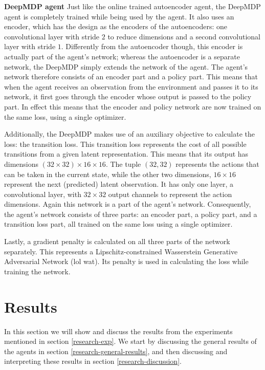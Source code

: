 \noindent \textbf{DeepMDP agent}\newline
\noindent Just like the online trained autoencoder agent, the DeepMDP agent is completely trained while being used by the agent. It also uses an encoder, which has the design as the encoders of the autoencoders: one convolutional layer with stride $2$ to reduce dimensions and a second convolutional layer with stride $1$. Differently from the autoencoder though, this encoder is actually part of the agent's network; whereas the autoencoder is a separate network, the DeepMDP simply extends the network of the agent. The agent's network therefore consists of an encoder part and a policy part. This means that when the agent receives an observation from the environment and passes it to its network, it first goes through the encoder whose output is passed to the policy part. In effect this means that the encoder and policy network are now trained on the same loss, using a single optimizer.

Additionally, the DeepMDP makes use of an auxiliary objective to calculate the loss: the transition loss. This transition loss represents the cost of all possible transitions from a given latent representation. This means that its output has dimensions $(32 \times 32) \times 16 \times 16$. The tuple $(32, 32)$ represents the actions that can be taken in the current state, while the other two dimensions, $16 \times 16$ represent the next (predicted) latent observation. It has only one layer, a convolutional layer, with $32 \times 32$ output channels to represent the action dimensions. Again this network is a part of the agent's network. Consequently, the agent's network consists of three parts: an encoder part, a policy part, and a transition loss part, all trained on the same loss using a single optimizer.

Lastly, a gradient penalty is calculated on all three parts of the network separately. This represents a Lipschitz-constrained Wasserstein Generative Adversarial Network (lol wat). Its penalty is used in calculating the loss while training the network. 


\section{Results}\label{research-results}
In this section we will show and discuss the results from the experiments mentioned in section \ref{research-exp}. We start by discussing the general results of the agents in section \ref{research-general-results}, and then discussing and interpreting these results in section \ref{research-discussion}.

